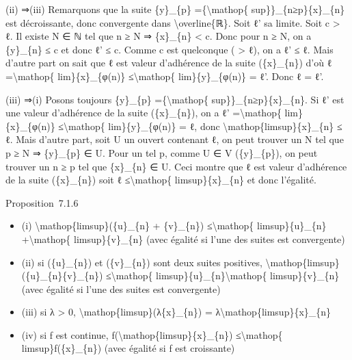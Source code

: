 \documentclass[]{article}
\begin{document}
(ii) ⇒(iii) Remarquons que la suite \{y\}\_\{p\}
=\{\textbackslash{}mathop\{ sup\}\}\_\{n≥p\}\{x\}\_\{n\} est
décroissante, donc convergente dans \textbackslash{}overline\{ℝ\}. Soit
ℓ' sa limite. Soit c \textgreater{} ℓ. Il existe N ∈ ℕ tel que n ≥ N ⇒
\{x\}\_\{n\} \textless{} c. Donc pour n ≥ N, on a \{y\}\_\{n\} ≤ c et
donc ℓ' ≤ c. Comme c est quelconque ( \textgreater{} ℓ), on a ℓ' ≤ ℓ.
Mais d'autre part on sait que ℓ est valeur d'adhérence de la suite
(\{x\}\_\{n\}) d'où ℓ =\textbackslash{}mathop\{ lim\}\{x\}\_\{φ(n)\}
≤\textbackslash{}mathop\{ lim\}\{y\}\_\{φ(n)\} = ℓ'. Donc ℓ = ℓ'.

(iii) ⇒(i) Posons toujours \{y\}\_\{p\} =\{\textbackslash{}mathop\{
sup\}\}\_\{n≥p\}\{x\}\_\{n\}. Si ℓ' est une valeur d'adhérence de la
suite (\{x\}\_\{n\}), on a ℓ' =\textbackslash{}mathop\{
lim\}\{x\}\_\{φ(n)\} ≤\textbackslash{}mathop\{ lim\}\{y\}\_\{φ(n)\} = ℓ,
donc \textbackslash{}mathop\{limsup\}\{x\}\_\{n\} ≤ ℓ. Mais d'autre
part, soit U un ouvert contenant ℓ, on peut trouver un N tel que p ≥ N ⇒
\{y\}\_\{p\} ∈ U. Pour un tel p, comme U ∈ V (\{y\}\_\{p\}), on peut
trouver un n ≥ p tel que \{x\}\_\{n\} ∈ U. Ceci montre que ℓ est valeur
d'adhérence de la suite (\{x\}\_\{n\}) soit ℓ ≤\textbackslash{}mathop\{
limsup\}\{x\}\_\{n\} et donc l'égalité.

Proposition~7.1.6

\begin{itemize}
\itemsep1pt\parskip0pt
\item
  (i) \textbackslash{}mathop\{limsup\}(\{u\}\_\{n\} + \{v\}\_\{n\})
  ≤\textbackslash{}mathop\{ limsup\}\{u\}\_\{n\}
  +\textbackslash{}mathop\{ limsup\}\{v\}\_\{n\} (avec égalité si l'une
  des suites est convergente)
\item
  (ii) si (\{u\}\_\{n\}) et (\{v\}\_\{n\}) sont deux suites positives,
  \textbackslash{}mathop\{limsup\}(\{u\}\_\{n\}\{v\}\_\{n\})
  ≤\textbackslash{}mathop\{ limsup\}\{u\}\_\{n\}\textbackslash{}mathop\{
  limsup\}\{v\}\_\{n\} (avec égalité si l'une des suites est
  convergente)
\item
  (iii) si λ \textgreater{} 0,
  \textbackslash{}mathop\{limsup\}(λ\{x\}\_\{n\}) =
  λ\textbackslash{}mathop\{limsup\}\{x\}\_\{n\}
\item
  (iv) si f est continue,
  f(\textbackslash{}mathop\{limsup\}\{x\}\_\{n\})
  ≤\textbackslash{}mathop\{ limsup\}f(\{x\}\_\{n\}) (avec égalité si f
  est croissante)
\end{itemize}
\end{document}
